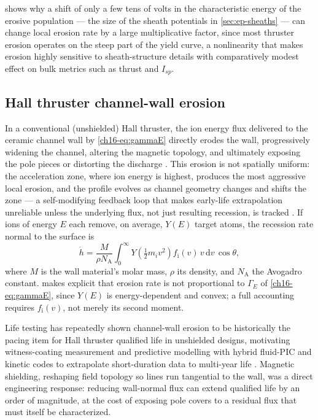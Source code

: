  shows why a shift of only a few tens of volts in the characteristic energy of the erosive population — the size of the sheath potentials in \cref{sec:ep-sheaths} — can change local erosion rate by a large multiplicative factor, since most thruster erosion operates on the steep part of the yield curve, a nonlinearity that makes erosion highly sensitive to sheath-structure details with comparatively modest effect on bulk metrics such as thrust and $I_{sp}$.

\subsection{Hall thruster channel-wall erosion}

In a conventional (unshielded) Hall thruster, the ion energy flux delivered to the ceramic channel wall by \cref{ch16-eq:gammaE} directly erodes the wall, progressively widening the channel, altering the magnetic topology, and ultimately exposing the pole pieces or distorting the discharge \cite{ref0425}. This erosion is not spatially uniform: the acceleration zone, where ion energy is highest, produces the most aggressive local erosion, and the profile evolves as channel geometry changes and shifts the zone — a self-modifying feedback loop that makes early-life extrapolation unreliable unless the underlying flux, not just resulting recession, is tracked \cite{ref0433}. If ions of energy $E$ each remove, on average, $Y(E)$ target atoms, the recession rate normal to the surface is
\begin{equation}
\dot h = \frac{M}{\rho N_{\mathrm{A}}} \int_0^{\infty} Y\!\left(\tfrac{1}{2}m_i v^2\right) f_{\mathrm{i}}(v)\, v\, \mathrm{d}v\, \cos\theta,
\label{eq:erosionrate}
\end{equation}
where $M$ is the wall material's molar mass, $\rho$ its density, and $N_{\mathrm{A}}$ the Avogadro constant.  makes explicit that erosion rate is not proportional to $\Gamma_{E}$ of \cref{ch16-eq:gammaE}, since $Y(E)$ is energy-dependent and convex; a full accounting requires $f_{\mathrm{i}}(v)$, not merely its second moment.

Life testing has repeatedly shown channel-wall erosion to be historically the pacing item for Hall thruster qualified life in unshielded designs, motivating witness-coating measurement and predictive modelling with hybrid fluid-PIC and kinetic codes to extrapolate short-duration data to multi-year life \cite{ref0433,ref0440}. Magnetic shielding, reshaping field topology so lines run tangential to the wall, was a direct engineering response: reducing wall-normal flux can extend qualified life by an order of magnitude, at the cost of exposing pole covers to a residual flux that must itself be characterized.

